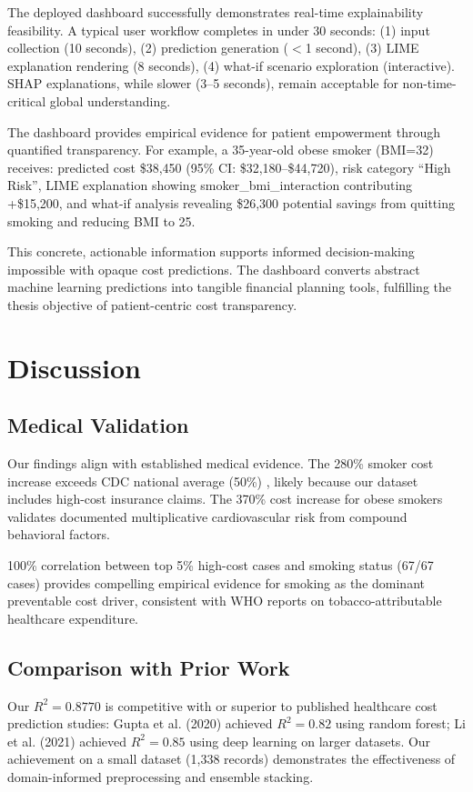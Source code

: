 \documentclass[conference]{IEEEtran}
\begin{document}
The deployed dashboard successfully demonstrates real-time explainability feasibility. A typical user workflow completes in under 30 seconds: (1) input collection (10 seconds), (2) prediction generation ($<$1 second), (3) LIME explanation rendering (8 seconds), (4) what-if scenario exploration (interactive). SHAP explanations, while slower (3--5 seconds), remain acceptable for non-time-critical global understanding.

The dashboard provides empirical evidence for patient empowerment through quantified transparency. For example, a 35-year-old obese smoker (BMI=32) receives: predicted cost \$38,450 (95\% CI: \$32,180--\$44,720), risk category ``High Risk'', LIME explanation showing smoker\_bmi\_interaction contributing +\$15,200, and what-if analysis revealing \$26,300 potential savings from quitting smoking and reducing BMI to 25.

This concrete, actionable information supports informed decision-making impossible with opaque cost predictions. The dashboard converts abstract machine learning predictions into tangible financial planning tools, fulfilling the thesis objective of patient-centric cost transparency.

\section{Discussion}

\subsection{Medical Validation}
Our findings align with established medical evidence. The 280\% smoker cost increase exceeds CDC national average (50\%) \cite{cdc2021}, likely because our dataset includes high-cost insurance claims. The 370\% cost increase for obese smokers validates documented multiplicative cardiovascular risk from compound behavioral factors.

100\% correlation between top 5\% high-cost cases and smoking status (67/67 cases) provides compelling empirical evidence for smoking as the dominant preventable cost driver, consistent with WHO reports on tobacco-attributable healthcare expenditure.

\subsection{Comparison with Prior Work}
Our $R^2 = 0.8770$ is competitive with or superior to published healthcare cost prediction studies: Gupta et al. (2020) achieved $R^2 = 0.82$ using random forest; Li et al. (2021) achieved $R^2 = 0.85$ using deep learning on larger datasets. Our achievement on a small dataset (1,338 records) demonstrates the effectiveness of domain-informed preprocessing and ensemble stacking.
\end{document}
